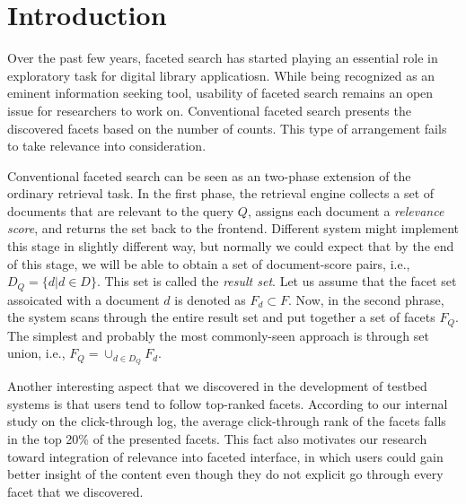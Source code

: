\section{Introduction}


Over the past few years, faceted search has started playing an essential role
in exploratory task for digital library applicatiosn.  While being recognized
as an eminent information seeking tool, usability of faceted search remains an
open issue for researchers to work on.  Conventional faceted search presents
the discovered facets based on the number of counts.  This type of arrangement
fails to take relevance into consideration. 

Conventional faceted search can be seen as an two-phase extension of the
ordinary retrieval task.  In the first phase, the retrieval engine collects a
set of documents that are relevant to the query $Q$, assigns each document a
\emph{relevance score}, and returns the set back to the frontend.  Different
system might implement this stage in slightly different way, but normally we
could expect that by the end of this stage, we will be able to obtain a set of
document-score pairs, i.e.,$D_Q = \{ d | d \in D \}$.  This set is called the
\emph{result set}.  Let us assume that the facet set assoicated with a document
$d$ is denoted as $F_d \subset F$.  Now, in the second phrase, the system scans
through the entire result set and put together a set of facets $F_Q$.  The
simplest and probably the most commonly-seen approach is through set union,
i.e., $F_Q = \cup_{d \in D_Q} F_d$.  

Another interesting aspect that we discovered in the development of testbed
systems is that users tend to follow top-ranked facets.  According to our
internal study on the click-through log, the average click-through rank of the
facets falls in the top 20\% of the presented facets.  This fact also motivates
our research toward integration of relevance into faceted interface, in which
users could gain better insight of the content even though they do not explicit
go through every facet that we discovered.

